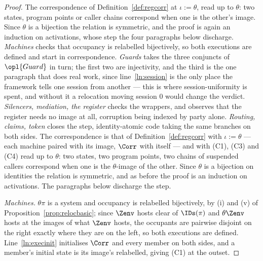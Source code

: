 \documentclass[10pt,oneside,openany]{book}
\theoremstyle{accentdef}
\theoremstyle{accentplain}
\begin{document}
\begin{proof}
The correspondence of Definition~\ref{def:regcorr} at $\iota := \theta$, read up to $\theta$: two
states, program points or caller chains correspond when one is the other's image. Since $\theta$ is
a bijection the relation is symmetric, and the proof is again an induction on activations, whose
step the four paragraphs below discharge. \emph{Machines} checks that occupancy is relabelled
bijectively, so both executions are defined and start in correspondence. \emph{Guards} takes the
three conjuncts of $\opl{Guard}$ in turn; the first two are injectivity, and the third is the one
paragraph that does real work, since line~\ref{ln:session} is the only place the framework tells one
session from another --- this is where session-uniformity is spent, and without it a relocation
moving session $0$ would change the verdict. \emph{Silencers, mediation, the register} checks the
wrappers, and observes that the register needs no image at all, corruption being indexed by party
alone. \emph{Routing, claims, token} closes the step, identity-atomic code taking the same branches
on both sides.
The correspondence is that of Definition~\ref{def:regcorr} with $\iota := \theta$ --- each machine
paired with its image, $\Corr$ with itself --- and with (C1), (C3) and (C4) read up to $\theta$: two
states, two program points, two chains of suspended callers correspond when one is the $\theta$-image
of the other. Since $\theta$ is a bijection on identities the relation is symmetric, and as before
the proof is an induction on activations. The paragraphs below discharge the step.

\emph{Machines.} $\theta\pi$ is a system and occupancy is relabelled bijectively, by (i) and (v) of
Proposition~\ref{prop:relocbasic}; since $\Zenv$ hosts clear of $\IDs(\pi)$ and $\theta\Zenv$ hosts
at the images of what $\Zenv$ hosts, the occupants are pairwise disjoint on the right exactly where
they are on the left, so both executions are defined. Line~\ref{ln:execinit} initialises $\Corr$ and
every member on both sides, and a member's initial state is its image's relabelled, giving (C1) at
the outset.


\end{proof}
\end{document}
